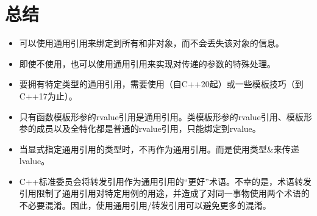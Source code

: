 \section{总结}
\begin{itemize}
	\item 可以使用通用引用来绑定到所有和非对象，而不会丢失该对象的信息。
	\item 即使不使用，也可以使用通用引用来实现对传递的参数的特殊处理。
	\item 要拥有特定类型的通用引用，需要使用（自C++20起）或一些模板技巧（到C++17为止）。
	\item 只有函数模板形参的rvalue引用是通用引用。类模板形参的rvalue引用、模板形参的成员以及全特化都是普通的rvalue引用，只能绑定到rvalue。
	\item 当显式指定通用引用的类型时，不再作为通用引用。而是使用类型\&来传递lvalue。
	\item C++标准委员会将转发引用作为通用引用的“更好”术语。不幸的是，术语转发引用限制了通用引用对特定用例的用途，并造成了对同一事物使用两个术语的不必要混淆。因此，使用通用引用/转发引用可以避免更多的混淆。
\end{itemize}


